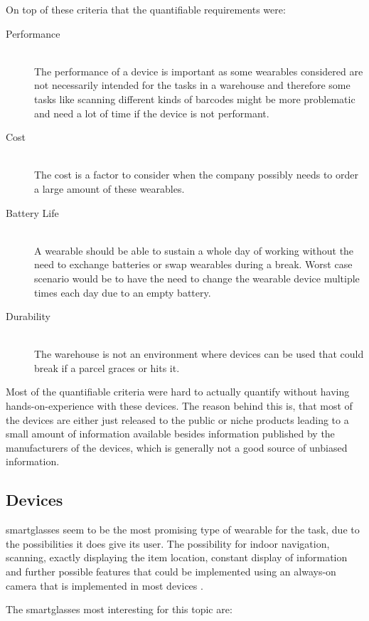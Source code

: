 On top of these criteria that the quantifiable requirements were:

\begin{description}
	\item[Performance] \hfill \\
	The performance of a device is important as some wearables considered are not necessarily intended for the tasks in a warehouse and therefore some tasks like scanning different kinds of barcodes might be more problematic and need a lot of time if the device is not performant.
	\item[Cost] \hfill \\
	The cost is a factor to consider when the company possibly needs to order a large amount of these wearables.
	\item[Battery Life] \hfill \\
	A wearable should be able to sustain a whole day of working without the need to exchange batteries or swap wearables during a break. Worst case scenario would be to have the need to change the wearable device multiple times each day due to an empty battery.
	\item[Durability] \hfill \\
	The warehouse is not an environment where devices can be used that could break if a \gls{parcel} graces or hits it.
\end{description}
Most of the quantifiable criteria were hard to actually quantify without having hands-on-experience with these devices. The reason behind this is, that most of the devices are either just released to the public or niche products leading to a small amount of information available besides information published by the manufacturers of the devices, which is generally not a good source of unbiased information.

\subsection{Devices}

\Gls{smartglasses} seem to be the most promising type of wearable for the task, due to the possibilities it does give its user. The possibility for indoor navigation, scanning, exactly displaying the item location, constant display of information and further possible features that could be implemented using an always-on camera that is implemented in most devices \citep{phdthesis:pickByVision}. 

The \gls{smartglasses} most interesting for this topic are:

